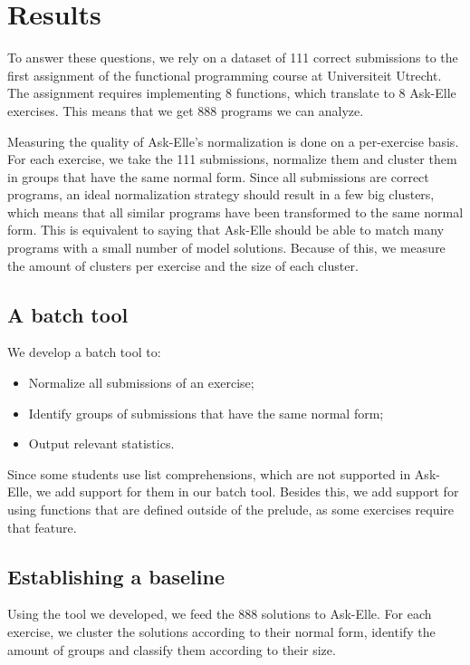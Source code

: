 \chapter{Results}
\label{sec:common-antipatterns}

To answer these questions, we rely on a dataset of 111 correct submissions to the first assignment of the functional programming course at Universiteit Utrecht. The assignment requires implementing 8 functions, which translate to 8 Ask-Elle exercises. This means that we get 888 programs we can analyze.

Measuring the quality of Ask-Elle's normalization is done on a per-exercise basis. For each exercise, we take the 111 submissions, normalize them and cluster them in groups that have the same normal form. Since all submissions are correct programs, an ideal normalization strategy should result in a few big clusters, which means that all similar programs have been transformed to the same normal form. This is equivalent to saying that Ask-Elle should be able to match many programs with a small number of model solutions. Because of this, we measure the amount of clusters per exercise and the size of each cluster.

\section{A batch tool}

We develop a batch tool to:

\begin{itemize}
    \item Normalize all submissions of an exercise;
    \item Identify groups of submissions that have the same normal form;
    \item Output relevant statistics.
\end{itemize}

Since some students use list comprehensions, which are not supported in Ask-Elle, we add support for them in our batch tool. Besides this, we add support for using functions that are defined outside of the prelude, as some exercises require that feature.

\section{Establishing a baseline}

Using the tool we developed, we feed the 888 solutions to Ask-Elle. For each exercise, we cluster the solutions according to their normal form, identify the amount of groups and classify them according to their size.

